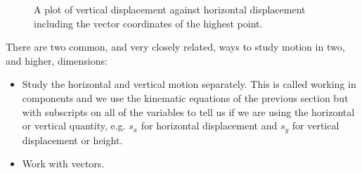\documentclass[a4paper,12pt]{book}
\begin{document}
\begin{figure}[ht]
    \centering
    \caption{A plot of vertical displacement against horizontal displacement including the vector coordinates of the highest point.}
    \label{fig: projectile motion}
\end{figure}


There are two common, and very closely related, ways to study motion in two, and higher, dimensions:
\begin{itemize}
\setlength{\itemsep}{-5pt}
    \item Study the horizontal and vertical motion separately. This is called working in components and we use the kinematic equations of the previous section but with subscripts on all of the variables to tell us if we are using the horizontal or vertical quantity, e.g. $s_{x}$ for horizontal displacement and $s_{y}$ for vertical displacement or height. 
    \item Work with vectors. 
\end{itemize}
\end{document}
